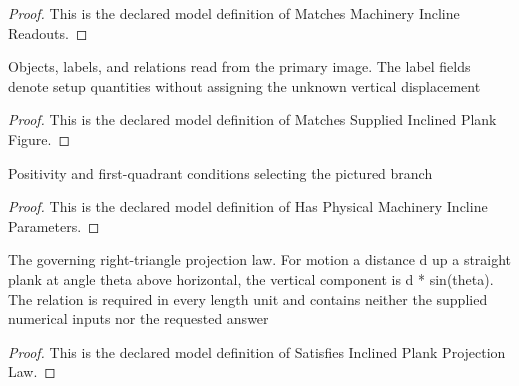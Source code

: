 \begin{proof}
  This is the declared model definition of Matches Machinery Incline Readouts.
\end{proof}
\begin{definition}
  \label{def:physics:phyx-mini-0733:phyxminiproblems-problemphyxmini0733-matchessuppliedinclinedplankfigure}
  Objects, labels, and relations read from the primary image. The label fields denote setup quantities without assigning the unknown vertical displacement
\end{definition}
\begin{proof}
  This is the declared model definition of Matches Supplied Inclined Plank Figure.
\end{proof}
\begin{definition}
  \label{def:physics:phyx-mini-0733:phyxminiproblems-problemphyxmini0733-hasphysicalmachineryinclineparameters}
  Positivity and first-quadrant conditions selecting the pictured branch
\end{definition}
\begin{proof}
  This is the declared model definition of Has Physical Machinery Incline Parameters.
\end{proof}
\begin{definition}
  \label{def:physics:phyx-mini-0733:phyxminiproblems-problemphyxmini0733-satisfiesinclinedplankprojectionlaw}
  The governing right-triangle projection law. For motion a distance d up a straight plank at angle theta above horizontal, the vertical component is d * sin(theta). The relation is required in every length unit and contains neither the supplied numerical inputs nor the requested answer
\end{definition}
\begin{proof}
  This is the declared model definition of Satisfies Inclined Plank Projection Law.
\end{proof}
